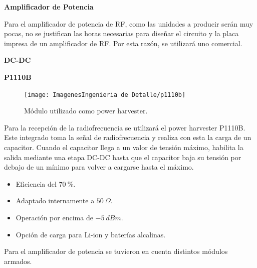 \textbf{Amplificador de Potencia}

Para el amplificador de potencia de RF, como las unidades a producir serán muy pocas, no se justifican las horas necesarias para diseñar el circuito y la placa impresa de un amplificador de RF. Por esta razón, se utilizará uno comercial. 

\textbf{DC-DC}

\tbc

\textbf{P1110B}

\begin{figure}[H]
	\centering	
	\texttt{[image: ImagenesIngenieria de Detalle/p1110b]}
	\caption{Módulo utilizado como power harvester.}
	\label{fig:p1110b}
\end{figure}

Para la recepción de la radiofrecuencia se utilizará el power harvester P1110B. Este integrado toma la señal de radiofrecuencia y realiza con esta la carga de un capacitor. Cuando el capacitor llega a un valor de tensión máximo, habilita la salida mediante una etapa DC-DC hasta que el capacitor baja su tensión por debajo de un mínimo para volver a cargarse hasta el máximo.
\begin{itemize}
	\item Eficiencia del $70 \ \%$.
	\item Adaptado internamente a $50 \ \Omega$.
	\item Operación por encima de $-5 \ dBm$.
	\item Opción de carga para Li-ion y baterías alcalinas.
\end{itemize}


Para el amplificador de potencia se tuvieron en cuenta distintos módulos armados.

